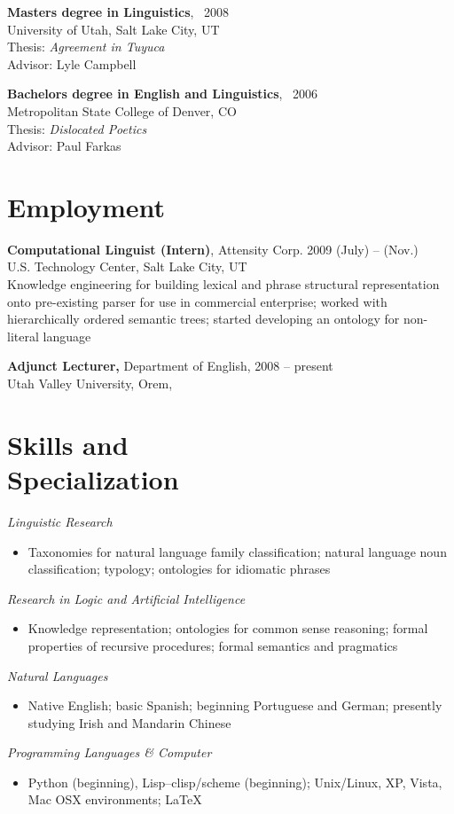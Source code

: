 \documentclass[margin,line,a4paper]{resume}
\begin{document}
\begin{resume}
{\bf Masters degree in Linguistics}, \ 2008\\ University of Utah, Salt Lake City, UT\\ Thesis: {\sl Agreement in Tuyuca}\\ Advisor: Lyle Campbell 

{\bf Bachelors degree in English and Linguistics}, \  2006\\ Metropolitan State College of Denver, CO\\ Thesis: {\sl Dislocated Poetics}\\ Advisor: Paul Farkas 

\section{Employment} 
  {\bf Computational Linguist (Intern)}, Attensity Corp. \hfill 2009 (July) -- (Nov.)\\
		U.S. Technology Center, Salt Lake City, UT \\
Knowledge engineering for building lexical and phrase structural representation onto pre-existing parser for use in commercial enterprise; worked with hierarchically ordered semantic trees; started developing an ontology for non-literal language 

    {\bf Adjunct Lecturer,} Department of English, \hfill 2008 -- present\\
    Utah Valley University, Orem,

\section{Skills and\\ Specialization} 
{\sl Linguistic Research}
    \begin{itemize} %
     \item[] Taxonomies for natural language family classification; natural language noun classification; typology; ontologies for idiomatic phrases 
      \end{itemize}
{\sl Research in Logic and Artificial Intelligence} 
       \begin{itemize}
        \item[] Knowledge representation; ontologies for common sense reasoning; formal properties of recursive procedures; formal semantics and pragmatics 
    \end{itemize}
{\sl Natural Languages} 
       \begin{itemize}
        \item[] Native English; basic Spanish; beginning Portuguese and German; presently studying Irish and Mandarin Chinese
    \end{itemize}
{\sl Programming Languages \& Computer} 
       \begin{itemize}
        \item[] Python (beginning), Lisp--clisp/scheme (beginning); Unix/Linux, XP, Vista, Mac OSX environments; \LaTeX
    \end{itemize}     
 

\end{resume}
\end{document}
